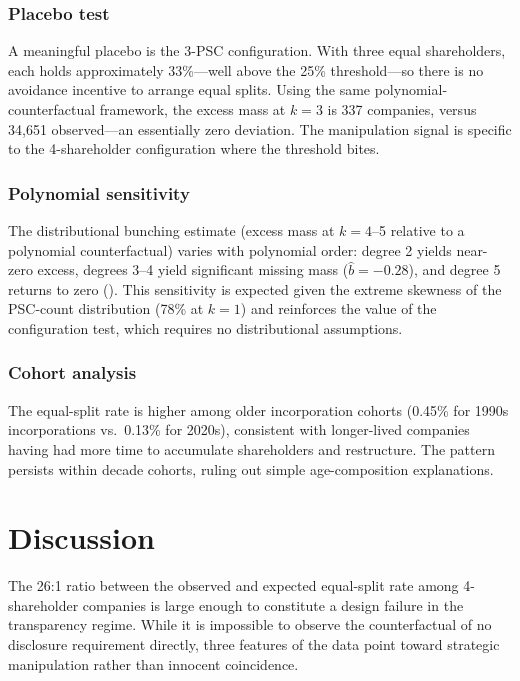 \documentclass[12pt]{article}
\begin{document}
\subsubsection*{Placebo test} A meaningful placebo is the 3-PSC configuration. With three equal shareholders, each holds approximately 33\%---well above the 25\% threshold---so there is no avoidance incentive to arrange equal splits. Using the same polynomial-counterfactual framework, the excess mass at $k = 3$ is 337 companies, versus 34,651 observed---an essentially zero deviation. The manipulation signal is specific to the 4-shareholder configuration where the threshold bites.

\subsubsection*{Polynomial sensitivity} The distributional bunching estimate (excess mass at $k = 4$--5 relative to a polynomial counterfactual) varies with polynomial order: degree 2 yields near-zero excess, degrees 3--4 yield significant missing mass ($\hat{b} = -0.28$), and degree 5 returns to zero (). This sensitivity is expected given the extreme skewness of the PSC-count distribution (78\% at $k = 1$) and reinforces the value of the configuration test, which requires no distributional assumptions.

\subsubsection*{Cohort analysis} The equal-split rate is higher among older incorporation cohorts (0.45\% for 1990s incorporations vs.\ 0.13\% for 2020s), consistent with longer-lived companies having had more time to accumulate shareholders and restructure. The pattern persists within decade cohorts, ruling out simple age-composition explanations.




\section{Discussion}
\label{sec:discussion}

The 26:1 ratio between the observed and expected equal-split rate among 4-shareholder companies is large enough to constitute a design failure in the transparency regime. While it is impossible to observe the counterfactual of no disclosure requirement directly, three features of the data point toward strategic manipulation rather than innocent coincidence.
\end{document}
